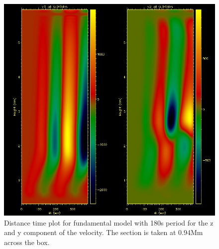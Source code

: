 \documentclass{aa}
\begin{document}
\begin{figure}[h]
\includegraphics[scale=0.5]{images/pm180s_sindrv_n0_6b0_3d_h1dt.jpg}
\caption{Distance time plot for fundamental model with 180s period for the z and y component of the velocity. The section  is taken at 0.94Mm across the box. }
\end{figure}


\end{document}
